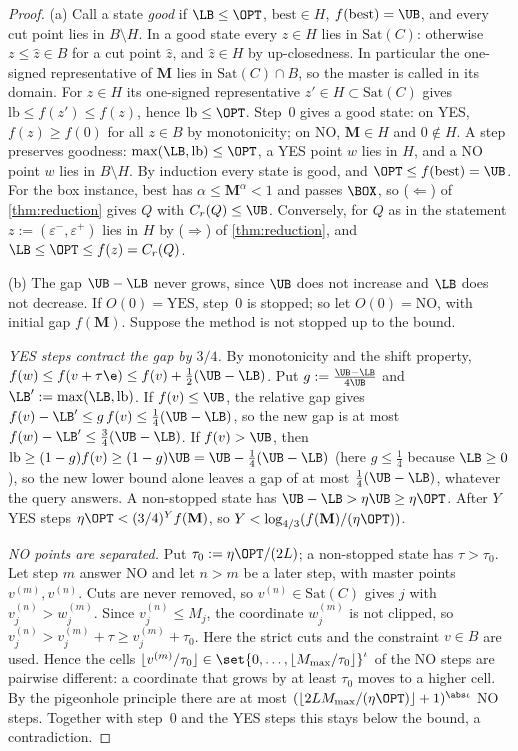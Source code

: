 \begin{proof}
(a) Call a state \emph{good} if $\LB\le\OPT$, $\mathrm{best}\in H$, $f(\mathrm{best})=\UB$, and every cut point lies in $B\setminus H$. In a good state every $z\in H$ lies in $\mathrm{Sat}(C)$: otherwise $z\le\hat z\in B$ for a cut point $\hat z$, and $\hat z\in H$ by up-closedness. In particular the one-signed representative of $\mathbf M$ lies in $\mathrm{Sat}(C)\cap B$, so the master is called in its domain. For $z\in H$ its one-signed representative $z'\in H\subset\mathrm{Sat}(C)$ gives $\mathrm{lb}\le f(z')\le f(z)$, hence $\mathrm{lb}\le\OPT$. Step~0 gives a good state: on YES, $f(z)\ge f(0)$ for all $z\in B$ by monotonicity; on NO, $\mathbf M\in H$ and $0\notin H$. A step preserves goodness: $\max(\LB,\mathrm{lb})\le\OPT$, a YES point $w$ lies in $H$, and a NO point $w$ lies in $B\setminus H$. By induction every state is good, and $\OPT\le f(\mathrm{best})=\UB$. For the box instance, $\mathrm{best}$ has $\alpha\le\mathbf M^\alpha<1$ and passes $\BOX$, so ($\Leftarrow$) of \cref{thm:reduction} gives $Q$ with $C_r(Q)\le\UB$. Conversely, for $Q$ as in the statement $z:=(\varepsilon^-,\varepsilon^+)$ lies in $H$ by ($\Rightarrow$) of \cref{thm:reduction}, and $\LB\le\OPT\le f(z)=C_r(Q)$.

(b) The gap $\UB-\LB$ never grows, since $\UB$ does not increase and $\LB$ does not decrease. If $O(0)=\mathrm{YES}$, step~0 is stopped; so let $O(0)=\mathrm{NO}$, with initial gap $f(\mathbf M)$. Suppose the method is not stopped up to the bound.

\emph{YES steps contract the gap by $3/4$.} By monotonicity and the shift property, $f(w)\le f(v+\tau\e)\le f(v)+\frac12(\UB-\LB)$. Put $g:=\frac{\UB-\LB}{4\UB}$ and $\LB':=\max(\LB,\mathrm{lb})$. If $f(v)\le\UB$, the relative gap gives $f(v)-\LB'\le g\,f(v)\le\frac14(\UB-\LB)$, so the new gap is at most $f(w)-\LB'\le\frac34(\UB-\LB)$. If $f(v)>\UB$, then $\mathrm{lb}\ge(1-g)f(v)\ge(1-g)\UB=\UB-\frac14(\UB-\LB)$ (here $g\le\frac14$ because $\LB\ge0$), so the new lower bound alone leaves a gap of at most $\frac14(\UB-\LB)$, whatever the query answers. A non-stopped state has $\UB-\LB>\eta\UB\ge\eta\OPT$. After $Y$ YES steps $\eta\OPT<(3/4)^Yf(\mathbf M)$, so $Y<\log_{4/3}(f(\mathbf M)/(\eta\OPT))$.

\emph{NO points are separated.} Put $\tau_0:=\eta\OPT/(2L)$; a non-stopped state has $\tau>\tau_0$. Let step $m$ answer NO and let $n>m$ be a later step, with master points $v^{(m)},v^{(n)}$. Cuts are never removed, so $v^{(n)}\in\mathrm{Sat}(C)$ gives $j$ with $v^{(n)}_j>w^{(m)}_j$. Since $v^{(n)}_j\le M_j$, the coordinate $w^{(m)}_j$ is not clipped, so $v^{(n)}_j>v^{(m)}_j+\tau\ge v^{(m)}_j+\tau_0$. Here the strict cuts and the constraint $v\in B$ are used. Hence the cells $\lfloor v^{(m)}/\tau_0\rfloor\in\set{0,\dots,\lfloor M_{\max}/\tau_0\rfloor}^\iota$ of the NO steps are pairwise different: a coordinate that grows by at least $\tau_0$ moves to a higher cell. By the pigeonhole principle there are at most $(\lfloor 2LM_{\max}/(\eta\OPT)\rfloor+1)^{\abs\iota}$ NO steps. Together with step~0 and the YES steps this stays below the bound, a contradiction.
\end{proof}

